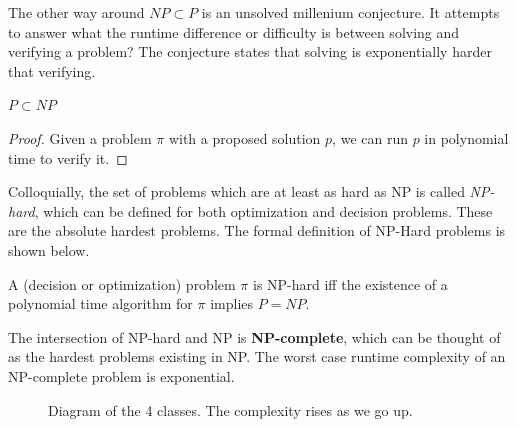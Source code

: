   The other way around $NP \subset P$ is an unsolved millenium conjecture. It attempts to answer what the runtime difference or difficulty is between solving and verifying a problem? The conjecture states that solving is exponentially harder that verifying. 

  \begin{theorem}
    $P \subset NP$
  \end{theorem}
  \begin{proof}
    Given a problem $\pi$ with a proposed solution $p$, we can run $p$ in polynomial time to verify it. 
  \end{proof}

  Colloquially, the set of problems which are at least as hard as NP is called \textit{NP-hard}, which can be defined for both optimization and decision problems. These are the absolute hardest problems. The formal definition of NP-Hard problems is shown below. 

  \begin{definition}[NP-Hard]
    A (decision or optimization) problem $\pi$ is NP-hard iff the existence of a polynomial time algorithm for $\pi$ implies $P = NP$. 
  \end{definition}

  \begin{definition}[NP-Complete]
    The intersection of NP-hard and NP is \textbf{NP-complete}, which can be thought of as the hardest problems existing in NP. The worst case runtime complexity of an NP-complete problem is exponential. 
  \end{definition}

  \begin{figure}[H]
    \centering 
    \caption{Diagram of the 4 classes. The complexity rises as we go up. } 
    \label{fig:class}
  \end{figure}
  
